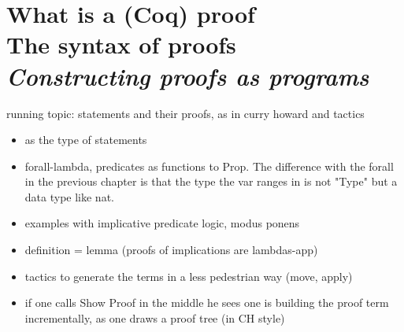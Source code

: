 \chapter{What is a (Coq) proof\\The syntax of proofs\\[2ex]\Large\itshape Constructing proofs as programs}

% 
% 
% 

running topic: statements and their proofs, as in curry howard and
tactics

\begin{itemize}
\item {} as the type of statements
\item forall-lambda, predicates as functions to Prop.  The difference with the forall in the previous chapter is that the type the var ranges in is not "Type" but a data type like nat.
\item examples with implicative predicate logic, modus ponens
\item definition = lemma (proofs of implications are lambdas-app)
\item tactics to generate the terms in a less pedestrian way (move, apply)
\item if one calls Show Proof in the middle he sees one is building
	the proof term incrementally, as one draws a proof tree (in CH style)
\end{itemize}

